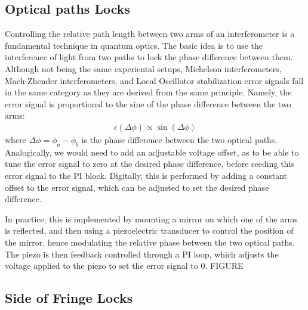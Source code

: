 \subsection{Optical paths Locks}
Controlling the relative path length between two arms of an interferometer is a fundamental technique in quantum optics. The basic idea is to use the interference of light from two paths to lock the phase difference between them. Although not being the same experiental setups, Michelson interferometers, Mach-Zhender interferometers, and Local Oscillator stabilization error signals fall in the same category as they are derived from the same principle. Namely, the error signal is proportional to the sine of the phase difference between the two arms: 
\begin{align}
\epsilon(\Delta \phi) \propto  \sin(\Delta \phi) 
\end{align}
where $\Delta \phi = \phi_a - \phi_b$ is the phase difference between the two optical paths. Analogically, we would need to add an adjustable voltage offset, as to be able to tune the error signal to zero at the desired phase difference, before seeding this error signal to the PI block. Digitally, this is performed by adding a constant offset to the error signal, which can be adjusted to set the desired phase difference. \newline

\noindent In practice, this is implemented by mounting a mirror on which one of the arms is reflected, and then using a piezoelectric transducer to control the position of the mirror, hence modulating the relative phase between the two optical paths. The piezo is then feedback controlled through a PI loop, which adjusts the voltage applied to the piezo to set the error signal to 0. 
FIGURE 

\subsection{Side of Fringe Locks}

